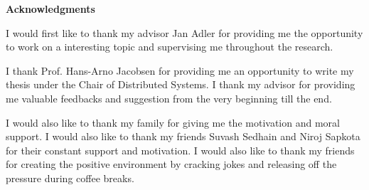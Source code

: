 \clearemptydoublepage
{}
{}	



\vspace*{2cm}

\begin{center}
{\Large \bf Acknowledgments}
\end{center}

\vspace{1cm}

I would first like to thank my advisor Jan Adler for providing me the opportunity to work on a interesting topic and supervising me throughout the research. 
\newline

I thank Prof. Hans-Arno Jacobsen for providing me an opportunity to write my thesis under the Chair of Distributed Systems. I thank my advisor for providing me valuable feedbacks and suggestion from the very beginning till the end.
\newline

I would also like to thank my family for giving me the motivation and moral support. I would also like to thank my friends Suvash Sedhain and Niroj Sapkota for their constant support and motivation. I would also like to thank my friends for creating the positive environment by cracking jokes and releasing off the pressure during coffee breaks.
